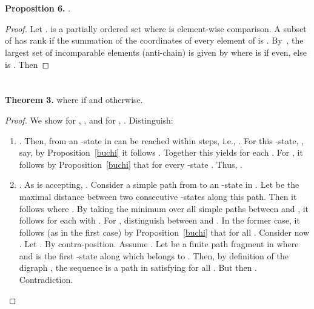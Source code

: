 \documentclass{llncs}
\begin{document}
\section{}
\textbf{Proposition 6.} .
\begin{proof}   
Let  .  is a partially ordered set where  is element-wise comparison. A subset  of  has rank  if the summation of the coordinates of every element of  is .
By~\cite{K1978}, the largest set of incomparable elements (anti-chain) is given by  where  is  if even, else  is . Then  \hfill \end{proof} 



\section{}
\textbf{Theorem 3.}
 where  
if  and  otherwise.

\begin{proof}
We show for , , and for ,
.
Distinguish:
\begin{enumerate}
\item .  
Then, from  an -state in  can be reached within  steps, i.e., .
For this -state, , say, by Proposition~\ref{buchi} it follows .
Together this yields  for each .
For , it follows by Proposition~\ref{buchi} that  for every -state .
Thus, .
\item
.  
As  is accepting, .
Consider a simple path  from  to an -state in .
Let  be the maximal distance between two consecutive -states along this path.
Then it follows  where .
By taking the minimum  over all simple paths between  and , it follows  for each  with .
For , distinguish between  and .
In the former case, it follows (as in the first case) by Proposition~\ref{buchi} that  for all . 
Consider now .
Let .
By contra-position.
Assume .
Let  be a finite path fragment in  where  and  is the first -state along  which belongs to .
Then, by definition of the digraph , the sequence  is a path in  satisfying  for all . 
But then .
Contradiction. \hfill 
\end{enumerate} \end{proof}
\end{document}
